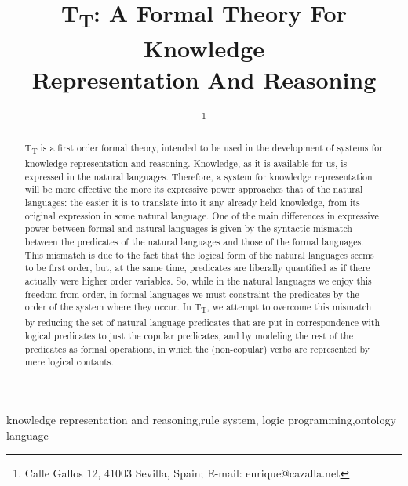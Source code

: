 \documentclass{IOS-Book-Article}     %
\def\hb{\hbox to 10.7 cm{}}
\begin{document}
\pagestyle{headings}
\def\thepage{}

\begin{frontmatter}          %
%
\title{T\textsubscript{T}: A Formal Theory For Knowledge\\
Representation And Reasoning}

\markboth{}{February 2016\hb}

\author{ 
\thanks{Calle Gallos 12, 41003 Sevilla, Spain; E-mail: enrique@cazalla.net}}
%
%
\begin{abstract}
T\textsubscript{T} is a first order formal theory, intended to be used in
the development of systems for knowledge representation and reasoning.
Knowledge, as it is available for us, is expressed in the natural languages.
Therefore, a system for knowledge representation will be more effective
the more its expressive power approaches that of the natural languages:
the easier it is to translate into it any already held knowledge, from its
original expression in some natural language.
One of the main differences in expressive power between formal and natural
languages is given by the
syntactic mismatch between the predicates of the natural
languages and those of the formal languages. This mismatch is due to the fact
that the logical form of the natural languages seems to be first order, but,
at the  same time, predicates are liberally quantified as if there
actually were higher order variables.
So, while in the natural languages we enjoy this freedom from order,
in formal languages we must constraint the predicates by the order of
the system where they occur.
In T\textsubscript{T}, we attempt to overcome this
mismatch by reducing the set of natural language predicates that are
put in correspondence with logical predicates to just the copular predicates,
and by modeling the rest of the predicates as formal operations,
in which the (non-copular) verbs are represented by mere logical contants.
\end{abstract}

\begin{keyword}
knowledge representation and reasoning\sep rule system\sep
logic programming\sep ontology language
\end{keyword}

\end{frontmatter}
\markboth{February 2016\hb}{February 2016\hb}
\end{document}

